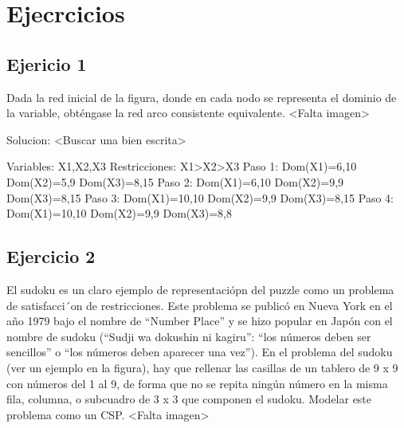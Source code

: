 \section{Ejecrcicios}
\subsection{Ejericio 1} Dada la red inicial de la figura, donde en cada nodo se representa el dominio de la
variable, obténgase la red arco consistente equivalente.
<Falta imagen>

Solucion: <Buscar una bien escrita>

Variables: X1,X2,X3
Restricciones: X1>X2>X3
Paso 1:
Dom(X1)={6,10}
Dom(X2)={5,9}
Dom(X3)={8,15}
Paso 2:
Dom(X1)={6,10}
Dom(X2)={9,9}
Dom(X3)={8,15}
Paso 3:
Dom(X1)={10,10}
Dom(X2)={9,9}
Dom(X3)={8,15}
Paso 4:
Dom(X1)={10,10}
Dom(X2)={9,9}
Dom(X3)={8,8}

\subsection{Ejercicio 2} El sudoku es un claro ejemplo de representaciópn del puzzle como un problema de
satisfacci´on de restricciones. Este problema se publicó en Nueva York en el año 1979
bajo el nombre de “Number Place” y se hizo popular en Japón con el nombre de sudoku
(“Sudji wa dokushin ni kagiru”: “los números deben ser sencillos” o “los números deben
aparecer una vez”).
\medskip
En el problema del sudoku (ver un ejemplo en la figura), hay que rellenar las casillas de
un tablero de 9 x 9 con números del 1 al 9, de forma que no se repita ningún número
en la misma fila, columna, o subcuadro de 3 x 3 que componen el sudoku. Modelar
este problema como un CSP.
<Falta imagen>

